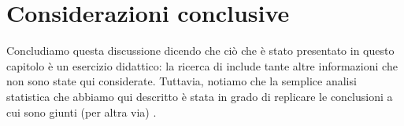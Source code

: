 \documentclass[
]{memoir}
\begin{document}
\hypertarget{considerazioni-conclusive}{%
\section*{Considerazioni conclusive}\label{considerazioni-conclusive}}

Concludiamo questa discussione dicendo che ciò che è stato presentato in questo capitolo è un esercizio didattico: la ricerca di \citet{Gautret_2020} include tante altre informazioni che non sono state qui considerate. Tuttavia, notiamo che la semplice analisi statistica che abbiamo qui descritto è stata in grado di replicare le conclusioni a cui sono giunti (per altra via) \citet{Hulme_2020}.

  
\end{document}
